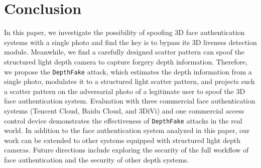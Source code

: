 \section{Conclusion}

In this paper, we investigate the possibility of spoofing 3D face authentication systems with a single photo and find the key is to bypass its 3D liveness detection module.
Meanwhile, we find a carefully designed scatter pattern can spoof the structured light depth camera to capture forgery depth information. 
Therefore, we propose the \texttt{DepthFake} attack, which estimates the depth information from a single photo, modulates it to a structured light scatter pattern, and projects such a scatter pattern  on the adversarial photo of a legitimate user to spoof the 3D face authentication system.
Evaluation with three commercial face authentication systems (Tencent Cloud, Baidu Cloud, and 3DiVi) and one commercial access control device demonstrates the effectiveness of \texttt{DepthFake}  attacks in the real world. In addition to the face authentication system analyzed in this paper, our work can be extended to other systems equipped with structured light depth cameras. Future directions include exploring the security of the full workflow of face authentication and the security of other depth systems.
